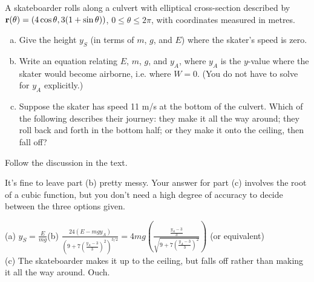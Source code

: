 \begin{question}
A skateboarder rolls along a culvert with elliptical cross-section described by\\ $\mathbf{r}(\theta)=(4\cos\theta,3(1+\sin\theta))$, $0 \le \theta \le 2\pi$, with coordinates measured in metres.

\begin{enumerate}[(a)]
	\item Give the height $y_S$ (in terms of $m$, $g$, and $E$) where the skater's speed is zero.
	\item Write an equation relating $E$, $m$, $g$, and $y_A$, where $y_A$ is the $y$-value where the skater would become airborne, i.e. where $W=0$. (You do not have to solve for $y_A$ explicitly.)
	\item Suppose the skater has speed 11 m/s at the bottom of the culvert.
	Which of the following describes their journey: they make it all the way around; they roll back and forth in the bottom half; or they make it onto the ceiling, then fall off?
	\end{enumerate}
\end{question}
\begin{hint}
	Follow the discussion in the text.
	
	It's fine to leave part (b) pretty messy. Your answer for part (c) involves the root of a cubic function, but you don't need a high degree of accuracy to decide between the three options given.
\end{hint}
\begin{answer}
(a) $y_S=\frac{E}{mg}$\qquad (b) $\frac{24\left(E-mgy_A\right)}{\left(9+7\left( \frac{y_A-3}{3}\right)^2 \right)^{3/2}} =4mg\left(\frac{ \frac{y_A-3}{3}}{\sqrt{9+7\left( \frac{y_A-3}{3}\right)^2}} \right) $ (or equivalent)\\
(c) The skateboarder makes it up to the ceiling, but falls off rather than making it all the way around. Ouch.
\end{answer}
